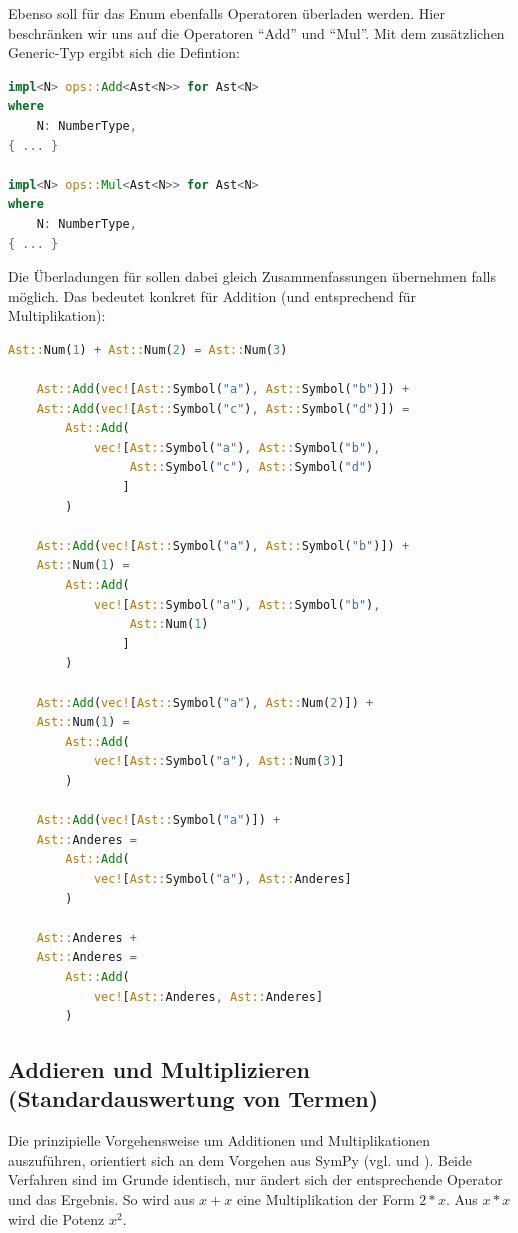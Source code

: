 \documentclass[11pt,a4paper, ngerman]{article}
\begin{document}
Ebenso soll für das Enum  ebenfalls Operatoren überladen werden. Hier beschränken wir uns auf die Operatoren ``Add'' und ``Mul''. Mit dem zusätzlichen Generic-Typ ergibt sich die Defintion:

\begin{lstlisting}[language=rust, caption={Ast Operatorenüberladung}]
impl<N> ops::Add<Ast<N>> for Ast<N>
where
    N: NumberType,
{ ... }

impl<N> ops::Mul<Ast<N>> for Ast<N>
where
    N: NumberType,
{ ... }
\end{lstlisting}

Die Überladungen für  sollen dabei gleich Zusammenfassungen übernehmen falls möglich. Das bedeutet konkret für Addition (und entsprechend für Multiplikation):

\begin{lstlisting}[language=rust, caption={smarte Operatenüberladung}]
    Ast::Num(1) + Ast::Num(2) = Ast::Num(3)

    Ast::Add(vec![Ast::Symbol("a"), Ast::Symbol("b")]) +
    Ast::Add(vec![Ast::Symbol("c"), Ast::Symbol("d")]) = 
        Ast::Add(
            vec![Ast::Symbol("a"), Ast::Symbol("b"), 
                 Ast::Symbol("c"), Ast::Symbol("d")
                ]
        )

    Ast::Add(vec![Ast::Symbol("a"), Ast::Symbol("b")]) +
    Ast::Num(1) =
        Ast::Add(
            vec![Ast::Symbol("a"), Ast::Symbol("b"), 
                 Ast::Num(1)
                ]
        )

    Ast::Add(vec![Ast::Symbol("a"), Ast::Num(2)]) +
    Ast::Num(1) =
        Ast::Add(
            vec![Ast::Symbol("a"), Ast::Num(3)]
        )

    Ast::Add(vec![Ast::Symbol("a")]) +
    Ast::Anderes =
        Ast::Add(
            vec![Ast::Symbol("a"), Ast::Anderes]
        )

    Ast::Anderes +
    Ast::Anderes =
        Ast::Add(
            vec![Ast::Anderes, Ast::Anderes]
        )
\end{lstlisting}

\label{sec:kapAddnundMult}
\subsection{Addieren und Multiplizieren (Standardauswertung von Termen)}
Die prinzipielle Vorgehensweise um Additionen und Multiplikationen auszuführen, orientiert sich an dem Vorgehen aus SymPy (vgl. \cite{SymPyAddFlatten} und \cite{SymPyMulFlatten}). Beide Verfahren sind im Grunde identisch, nur ändert sich der entsprechende Operator und das Ergebnis. So wird aus $x+x$ eine Multiplikation der Form $2*x$. Aus $x*x$ wird die Potenz $x^2$. 
\end{document}
